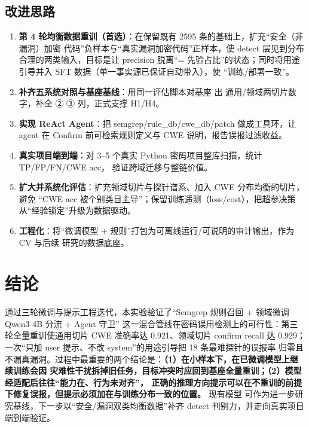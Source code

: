 \documentclass[11pt,a4paper,fontset=none]{ctexart}
\newcommand{\code}[1]{\begingroup\ttfamily\small\detokenize{#1}\endgroup}
\begin{document}
\subsection{改进思路}
\begin{enumerate}
  \item \textbf{第 4 轮均衡数据重训（首选）}：在保留既有 2595 条的基础上，扩充“安全（非漏洞）加密
    代码”负样本与“真实漏洞加密代码”正样本，使 detect 层见到分布合理的两类输入，目标是让 precision
    脱离“= 先验占比”的状态；同时将用途引导并入 SFT 数据（单一事实源已保证自动带入），使
    “训练/部署一致”。
  \item \textbf{补齐五系统对照与基座基线}：用同一评估脚本对基座 \code{qwen3-4b-instruct-2507} 出
    通用/领域两切片数字，补全 ② ③ 列，正式支撑 H1/H4。
  \item \textbf{实现 ReAct Agent}：把 semgrep/rule\_db/cwe\_db/patch 做成工具环，让 agent 在
    Confirm 前可检索规则定义与 CWE 说明，报告误报过滤收益。
  \item \textbf{真实项目端到端}：对 3--5 个真实 Python 密码项目整库扫描，统计 TP/FP/FN/CWE acc，
    验证跨域迁移与整链价值。
  \item \textbf{扩大并系统化评估}：扩充领域切片与探针谱系、加入 CWE 分布均衡的切片，避免
    “CWE acc 被个别类目主导”；保留训练遥测（loss/cost），把超参决策从“经验锁定”升级为数据驱动。
  \item \textbf{工程化}：将“微调模型 + 规则”打包为可离线运行/可说明的审计输出，作为 CV 与后续
    研究的数据底座。
\end{enumerate}

\section{结论}
通过三轮微调与提示工程迭代，本实验验证了“Semgrep 规则召回 + 领域微调 Qwen3-4B 分流 + Agent 守卫”
这一混合管线在密码误用检测上的可行性：第三轮全量重训使通用切片 CWE 准确率达 0.921、领域切片
confirm recall 达 0.929；一次“只加 user 提示、不改 system”的用途引导把 18 条最难探针的误报率
归零且不漏真漏洞。过程中最重要的两个结论是：\textbf{（1）在小样本下，在已微调模型上继续训练会因
灾难性干扰拆掉旧任务，目标冲突时应回到基座全量重训；（2）模型经适配后往往“能力在、行为未对齐”，
正确的推理方向提示可以在不重训的前提下修复误报，但提示必须加在与训练分布一致的位置。} 现有模型
可作为进一步研究基线，下一步以“安全/漏洞双类均衡数据”补齐 detect 判别力，并走向真实项目端到端验证。
\end{document}
